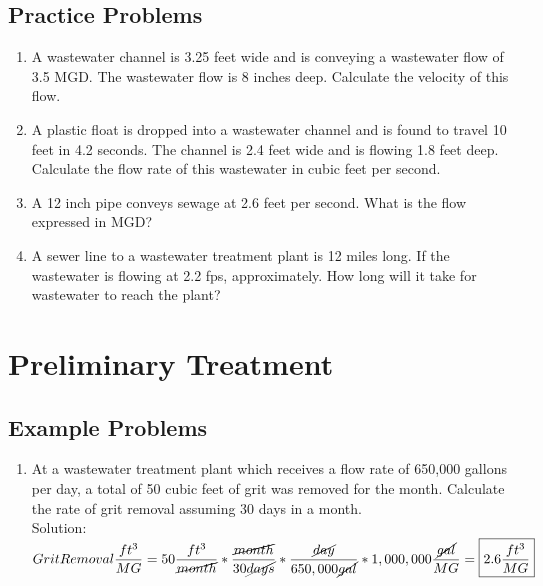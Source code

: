 \subsection{Practice Problems} 

\begin{enumerate}
\item A wastewater channel is 3.25 feet wide and is conveying a wastewater flow of 3.5 MGD. The wastewater flow is 8 inches deep. Calculate the velocity of this flow.\\

\item A plastic float is dropped into a wastewater channel and is found to travel 10 feet in 4.2 seconds. The channel is 2.4 feet wide and is flowing 1.8 feet deep. Calculate the flow rate of this wastewater in cubic feet per second.\\

\item A 12 inch pipe conveys sewage at 2.6 feet per second.  What is the flow expressed in MGD?

\item A sewer line to a wastewater treatment plant is 12 miles long. If the wastewater is flowing at 2.2 fps, approximately.  How long will it take for wastewater to reach the plant?\\
 
\end{enumerate}
\newpage

\section{Preliminary Treatment}

\subsection{Example Problems} 

\begin{enumerate}

\item At a wastewater treatment plant which receives a flow rate of 650,000 gallons per day, a total of 50 cubic feet of grit was removed for the month. Calculate the rate of grit removal assuming 30 days in a month.\\
Solution:\\
$Grit Removal\dfrac{ft^3}{MG}=50\dfrac{ft^3}{ \cancel{month}}*\dfrac{\cancel{month}}{30\cancel{days}}*\dfrac{\cancel{day}}{650,000\cancel{gal}}*1,000,000\dfrac{\cancel{gal}}{MG}=\boxed{2.6\dfrac{ft^3}{MG}}$

\end{enumerate}

